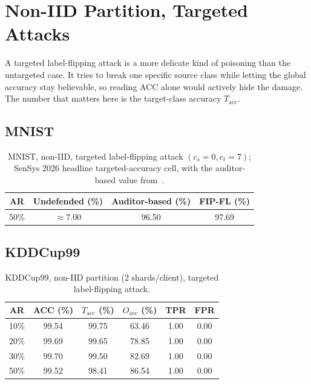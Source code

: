 \section{Non-IID Partition, Targeted Attacks}
\label{sec:res-nonIID-targ}

A targeted label-flipping attack is a more delicate kind of poisoning than the untargeted case. It tries to break one specific source class while letting the global accuracy stay believable, so reading ACC alone would actively hide the damage. The number that matters here is the target-class accuracy $T_{\text{acc}}$.

\subsection{MNIST}
\label{sec:res-nonIID-targ-mnist}

\begin{table}[H]
\centering
\caption{MNIST, non-IID, targeted label-flipping attack $(c_s=0,c_t=7)$; SenSys 2026 headline targeted-accuracy cell, with the auditor-based value from~\cite{yazdinejad2024robust}.}
\label{tab:res-nonIID-targ-mnist}
\begin{tabular}{@{}cccc@{}}
\toprule
\textbf{AR} & \textbf{Undefended (\%)} & \textbf{Auditor-based (\%)} & \textbf{FIP-FL (\%)} \\
\midrule
50\% & $\approx 7.00$ & 96.50 & 97.69 \\
\bottomrule
\end{tabular}
\end{table}

\subsection{KDDCup99}
\label{sec:res-nonIID-targ-kdd}

\begin{table}[H]
\centering
\caption{KDDCup99, non-IID partition (2 shards/client), targeted label-flipping attack.}
\label{tab:res-nonIID-targ-kdd}
\begin{tabular}{@{}cccccc@{}}
\toprule
\textbf{AR} & \textbf{ACC (\%)} & \textbf{$T_{\text{acc}}$ (\%)} & \textbf{$O_{\text{acc}}$ (\%)} & \textbf{TPR} & \textbf{FPR} \\
\midrule
10\% & 99.54 & 99.75 & 63.46 & 1.00 & 0.00 \\
20\% & 99.69 & 99.65 & 78.85 & 1.00 & 0.00 \\
30\% & 99.70 & 99.50 & 82.69 & 1.00 & 0.00 \\
50\% & 99.52 & 98.41 & 86.54 & 1.00 & 0.00 \\
\bottomrule
\end{tabular}
\end{table}

